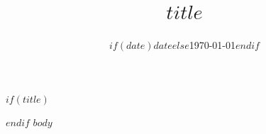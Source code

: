 \documentclass[11pt,a4paper,uplatex,dvipdfmx]{ujarticle}
\begin{document}
$if(title)$
\title{$title$}
\date{$if(date)$$date$$else$\today$endif$}
\maketitle
$endif$
$body$
\end{document}
